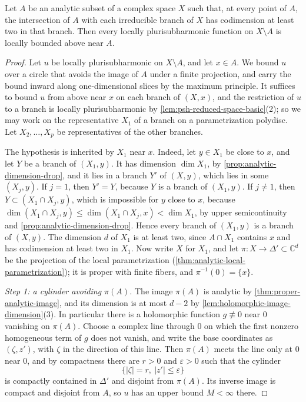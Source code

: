 \begin{proposition}\label{prop:singular-codimension-two-upper-bound}
Let $A$ be an analytic subset of a complex space $X$ such that, at every point of $A$, the intersection of $A$ with each irreducible branch of $X$ has codimension at least two in that branch. Then every locally plurisubharmonic function on $X\setminus A$ is locally bounded above near $A$.
\end{proposition}
\begin{proof}
Let $u$ be locally plurisubharmonic on $X\setminus A$, and let $x\in A$. We bound $u$ over a circle that avoids the image of $A$ under a finite projection, and carry the bound inward along one-dimensional slices by the maximum principle. It suffices to bound $u$ from above near $x$ on each branch of $(X,x)$, and the restriction of $u$ to a branch is locally plurisubharmonic by \cref{lem:psh-reduced-space-basic}(2); so we may work on the representative $X_1$ of a branch on a parametrization polydisc. Let $X_2,\ldots,X_p$ be representatives of the other branches.

The hypothesis is inherited by $X_1$ near $x$. Indeed, let $y\in X_1$ be close to $x$, and let $Y$ be a branch of $(X_1,y)$. It has dimension $\dim X_1$, by \cref{prop:analytic-dimension-drop}, and it lies in a branch $Y'$ of $(X,y)$, which lies in some $(X_j,y)$. If $j=1$, then $Y'=Y$, because $Y$ is a branch of $(X_1,y)$. If $j\neq1$, then $Y\subset(X_1\cap X_j,y)$, which is impossible for $y$ close to $x$, because $\dim(X_1\cap X_j,y)\leq\dim(X_1\cap X_j,x)<\dim X_1$, by upper semicontinuity and \cref{prop:analytic-dimension-drop}. Hence every branch of $(X_1,y)$ is a branch of $(X,y)$. The dimension $d$ of $X_1$ is at least two, since $A\cap X_1$ contains $x$ and has codimension at least two in $X_1$. Now write $X$ for $X_1$, and let $\pi\colon X\to\Delta'\subset\mathbb C^d$ be the projection of the local parametrization (\cref{thm:analytic-local-parametrization}); it is proper with finite fibers, and $\pi^{-1}(0)=\{x\}$.

\emph{Step 1: a cylinder avoiding $\pi(A)$.} The image $\pi(A)$ is analytic by \cref{thm:proper-analytic-image}, and its dimension is at most $d-2$ by \cref{lem:holomorphic-image-dimension}(3). In particular there is a holomorphic function $g\not\equiv0$ near $0$ vanishing on $\pi(A)$. Choose a complex line through $0$ on which the first nonzero homogeneous term of $g$ does not vanish, and write the base coordinates as $(\zeta,z')$, with $\zeta$ in the direction of this line. Then $\pi(A)$ meets the line only at $0$ near $0$, and by compactness there are $r>0$ and $\varepsilon>0$ such that the cylinder
\[
 \{|\zeta|=r,\ |z'|\leq\varepsilon\}
\]
is compactly contained in $\Delta'$ and disjoint from $\pi(A)$. Its inverse image is compact and disjoint from $A$, so $u$ has an upper bound $M<\infty$ there.


\end{proof}
